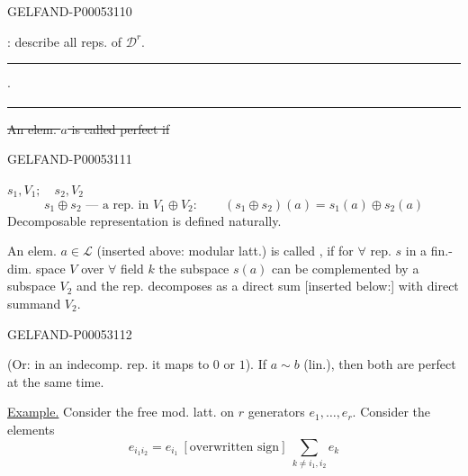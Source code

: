 \begin{GelfandAdjacentEvidence}{GELFAND-P000531}{10}


: describe all reps. of $\mathcal D^r$.

\hfill\rule{1.1cm}{.35pt}\enspace\(\cdot\)\enspace\rule{1.3cm}{.35pt}\par

\sout{An elem. \mbox{$a$} is called perfect if}
\end{GelfandAdjacentEvidence}
\begin{GelfandAdjacentEvidence}{GELFAND-P000531}{11}


$s_1,V_1;\quad s_2,V_2$
\[
s_1\oplus s_2\text{ — a rep. in }V_1\oplus V_2:\qquad
(s_1\oplus s_2)(a)=s_1(a)\oplus s_2(a)
\]
Decomposable representation is defined naturally.

An elem. $a\in\mathcal L$ (inserted above: modular latt.) is called , if for $\forall$ rep.
$s$ in a fin.-dim. space $V$ over $\forall$ field $k$ the subspace $s(a)$
can be complemented by a subspace $V_2$ and the rep. decomposes as a direct sum [inserted below:] with direct summand $V_2$.
\end{GelfandAdjacentEvidence}
\begin{GelfandAdjacentEvidence}{GELFAND-P000531}{12}


(Or: in an indecomp. rep. it maps to $0$ or $1$).
If $a\sim b$ (lin.), then both are perfect at the same time.

\uline{Example.} Consider the free mod. latt. on $r$ generators $e_1,\ldots,e_r$. Consider the elements
\[
e_{i_1i_2}=e_{i_1}\ [\text{overwritten sign}]\ \sum_{k\ne i_1,i_2}e_k
\]
\end{GelfandAdjacentEvidence}




